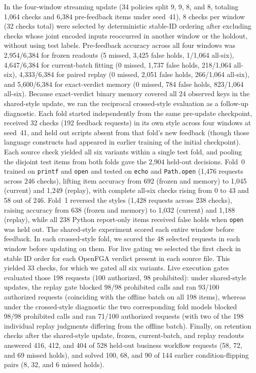 In the four-window streaming update (34 policies split 9, 9, 8, and 8, totaling 1,064 checks and 6,384 pre-feedback items under seed~41), 8 checks per window (32 checks total) were selected by deterministic stable-ID ordering after excluding checks whose joint encoded inputs reoccurred in another window or the holdout, without using test labels. Pre-feedback accuracy across all four windows was 2,954/6,384 for frozen readouts (5 missed, 3,425 false holds, 1/1,064 all-six), 4,647/6,384 for current-batch fitting (0 missed, 1,737 false holds, 218/1,064 all-six), 4,333/6,384 for paired replay (0 missed, 2,051 false holds, 266/1,064 all-six), and 5,600/6,384 for exact-verdict memory (0 missed, 784 false holds, 823/1,064 all-six). Because exact-verdict binary memory covered all 24 observed keys in the shared-style update, we ran the reciprocal crossed-style evaluation as a follow-up diagnostic. Each fold started independently from the same pre-update checkpoint, received 32 checks (192 feedback requests) in its own style across four windows at seed~41, and held out scripts absent from that fold's new feedback (though those language constructs had appeared in earlier training of the initial checkpoint). Each source check yielded all six variants within a single test fold, and pooling the disjoint test items from both folds gave the 2,904 held-out decisions. Fold~0 trained on \texttt{printf} and \texttt{open} and tested on \texttt{echo} and \texttt{Path.open} (1,476 requests across 246 checks), lifting item accuracy from 692 (frozen and memory) to 1,045 (current) and 1,249 (replay), with complete all-six checks rising from 0 to 43 and 58 out of 246. Fold~1 reversed the styles (1,428 requests across 238 checks), raising accuracy from 638 (frozen and memory) to 1,032 (current) and 1,188 (replay), while all 238 Python report-only items received false holds when \texttt{open} was held out. The shared-style experiment scored each entire window before feedback. In each crossed-style fold, we scored the 48 selected requests in each window before updating on them. For live gating we selected the first check in stable ID order for each OpenFGA verdict present in each source file. This yielded 33 checks, for which we gated all six variants. Live execution gates evaluated those 198 requests (100 authorized, 98 prohibited): under shared-style updates, the replay gate blocked 98/98 prohibited calls and ran 93/100 authorized requests (coinciding with the offline batch on all 198 items), whereas under the crossed-style diagnostic the two corresponding fold models blocked 98/98 prohibited calls and ran 71/100 authorized requests (with two of the 198 individual replay judgments differing from the offline batch). Finally, on retention checks after the shared-style update, frozen, current-batch, and replay readouts answered 416, 412, and 404 of 528 held-out business workflow requests (58, 72, and 69 missed holds), and solved 100, 68, and 90 of 144 earlier condition-flipping pairs (8, 32, and 6 missed holds).
